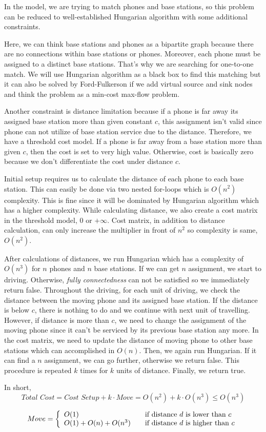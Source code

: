 In the model, we are trying to match phones and base stations, so this problem can be reduced to well-established Hungarian algorithm with some additional constraints.

Here, we can think base stations and phones as a bipartite graph because there are no connections within base stations or phones. Moreover, each phone must be assigned to a distinct base stations. That's why we are searching for one-to-one match. We will use Hungarian algorithm as a black box to find this matching but it can also be solved by Ford-Fulkerson if we add virtual source and sink nodes and think the problem as a min-cost max-flow problem.

Another constraint is distance limitation because if a phone is far away its assigned base station more than given constant $c$, this assignment isn't valid since phone can not utilize of base station service due to the distance. Therefore, we have a threshold cost model. If a phone is far away from a base station more than given $c$, then the cost is set to very high value. Otherwise, cost is basically zero because we don't differentiate the cost under distance $c$.

Initial setup requires us to calculate the distance of each phone to each base station. This can easily be done via two nested for-loops which is $O(n^2)$ complexity. This is fine since it will be dominated by Hungarian algorithm which has a higher complexity. While calculating distance, we also create a cost matrix in the threshold model, 0 or $+\infty$.  Cost matrix, in addition to distance calculation, can only increase the multiplier in front of $n^2$ so complexity is same, $O(n^2)$.

After calculations of distances, we run Hungarian which has a complexity of $O(n^3)$ for $n$ phones and $n$ base stations. If we can get $n$ assignment, we start to driving. Otherwise, \textit{fully connectedness} can not be satisfied so we immediately return false. Throughout the driving, for each unit of driving, we check the distance between the moving phone and its assigned base station. If the distance is below $c$, there is nothing to do and we continue with next unit of travelling. However, if distance is more than $c$, we need to change the assignment of the moving phone since it can't be serviced by its previous base station any more. In the cost matrix, we need to update the distance of moving phone to other base stations which can accomplished in $O(n)$. Then, we again run Hungarian. If it can find a $n$ assignment, we can go further, otherwise we return false. This procedure is repeated $k$ times for $k$ units of distance. Finally, we return true.

In short, 
$$
  \textit{Total Cost} = \textit{Cost Setup} + k \cdot Move = O(n^2) + k \cdot O(n^3) \leq O(n^3)
$$

\[
  Move = \left\{ 
  \begin{array}{l l}
    O(1) & \quad \text{if distance $d$ is lower than $c$}\\
    O(1) + O(n) + O(n^3) & \quad \text{if distance $d$ is higher than $c$}\\
  \end{array} \right.
\]